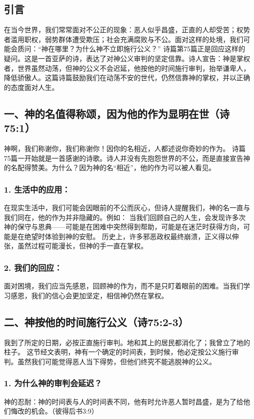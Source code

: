 \documentclass[a4paper, 12pt]{article}
\begin{document}
\subsection*{引言}
在当今世界，我们常常面对不公正的现象：恶人似乎昌盛，正直的人却受苦；权势者滥用职权，弱势群体遭受欺压；社会充满腐败与不公。面对这样的处境，我们可能会质问：“神在哪里？为什么神不立即施行公义？”
诗篇第75篇正是回应这样的疑问。这是一首亚萨的诗，表达了对神公义审判的坚定信靠。诗人宣告：神是掌权者，世界虽然动荡，但神的公义不会迟延，他按他的时间施行审判，抬举谦卑人，降低骄傲人。这篇诗篇鼓励我们在动荡不安的世代，仍然信靠神的掌权，并以正确的态度面对人生。
\subsection*{一、神的名值得称颂，因为他的作为显明在世（诗75:1）}
神啊，我们称谢你，我们称谢你！因你的名相近，人都述说你奇妙的作为。
诗篇75篇一开始就是一首感谢的诗歌。诗人并没有先抱怨世界的不公，而是直接宣告神的名配得赞美。为什么？因为神的名“相近”，他的作为可以被人看见。
\subsubsection*{1. 生活中的应用：}
在现实生活中，我们可能会因眼前的不公而灰心，但诗人提醒我们，神的名一直与我们同在，他的作为并非隐藏的。例如：
当我们回顾自己的人生，会发现许多次神的保守与恩典——可能是在困难中突然得到帮助，可能是在迷茫时获得方向，可能是在绝望时体验到神的安慰。
历史上，许多邪恶政权最终崩溃，正义得以伸张，虽然过程可能漫长，但神的手一直在掌权。
\subsubsection*{2. 我们的回应：}
面对困境，我们应当先感恩，回顾神的作为，而不是只盯着眼前的困难。当我们学习感恩，我们的信心会更加坚定，相信神仍然在掌权。
\subsection*{二、神按他的时间施行公义（诗75:2-3）}
我到了所定的日期，必按正直施行审判。地和其上的居民都消化了；我曾立了地的柱子。
这节经文表明，神有一个确定的时间表，到时候，他必定按公义施行审判。虽然我们可能觉得恶人当下得势，但他们终究不能逃脱神的公义。
\subsubsection*{1. 为什么神的审判会延迟？}
\hspace{0.6cm}神的忍耐：神的时间表与人的时间表不同，他有时允许恶人暂时昌盛，是为了给他们悔改的机会。（彼得后书3:9）
\end{document}

